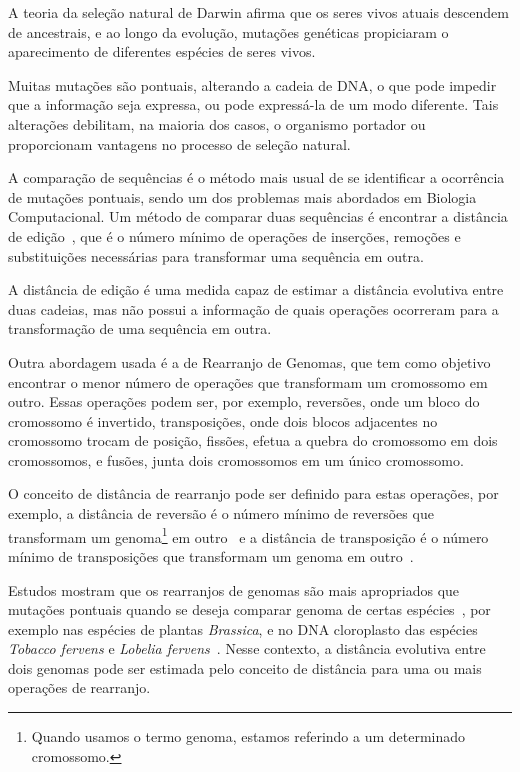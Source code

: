A teoria da seleção natural de Darwin afirma que os seres vivos atuais
descendem de ancestrais, e ao longo da evolução, mutações genéticas
propiciaram o aparecimento de diferentes espécies de seres vivos. 

Muitas mutações são pontuais, alterando a cadeia de DNA, o que pode
impedir que a informação seja expressa, ou pode expressá-la de um modo
diferente. Tais alterações debilitam, na maioria dos casos, o organismo
portador ou proporcionam vantagens no processo de seleção natural.

A comparação de sequências é o método mais usual de se identificar a
ocorrência de mutações pontuais, sendo um dos problemas mais abordados
em Biologia Computacional. Um método de comparar duas sequências é
encontrar a distância de edição~\cite{SetubalMeidanis*1997}, que é o
número mínimo de operações de inserções, remoções e substituições
necessárias para transformar uma sequência em outra. 

A distância de edição é uma medida capaz de estimar a distância
evolutiva entre duas cadeias, mas não possui a informação de quais
operações ocorreram para a transformação de uma sequência em outra.

Outra abordagem usada é a de Rearranjo de Genomas, que tem como objetivo
encontrar o menor número de operações que transformam um cromossomo em
outro. Essas operações podem ser, por exemplo, reversões, onde um bloco
do cromossomo é invertido, transposições, onde dois blocos adjacentes no
cromossomo trocam de posição, fissões, efetua a quebra do cromossomo em
dois cromossomos, e fusões, junta dois cromossomos em um único
cromossomo.

O conceito de distância de rearranjo pode ser definido para estas
operações, por exemplo, a distância de reversão é o número mínimo de
reversões que transformam um genoma\footnote{Quando usamos o termo
genoma, estamos referindo a um determinado cromossomo.} em
outro~\cite{BafnaPevzner*1996} e a distância de transposição é o número
mínimo de transposições que transformam um genoma em
outro~\cite{BafnaPevzner*1998}. 

Estudos mostram que os rearranjos de genomas são mais apropriados que
mutações pontuais quando se deseja comparar genoma de certas
espécies~\cite{PalmerHerbon*1988}, por exemplo nas espécies de plantas
\textit{Brassica}, e no DNA cloroplasto das espécies \textit{Tobacco
fervens} e \textit{Lobelia fervens}~\cite{BafnaPevzner*1996}. Nesse
contexto, a distância evolutiva entre dois genomas pode ser estimada
pelo conceito de distância para uma ou mais operações de rearranjo.

